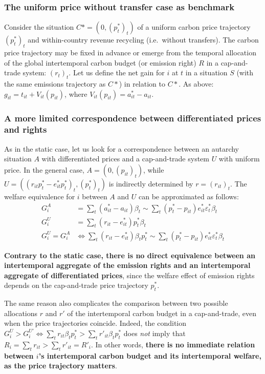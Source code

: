 \documentclass[12pt,english]{article}
\begin{document}
\subsubsection*{The uniform price without transfer case as
benchmark}\label{the-uniform-price-without-transfer-case-as-benchmark}

Consider the situation $C*=(0,(p^*_t)_t)$ of a uniform carbon price
trajectory $(p^*_t)_t$ and within-country revenue recycling
(i.e.~without transfers). The carbon price trajectory may be fixed in
advance or emerge from the temporal allocation of the global
intertemporal carbon budget (or emission right) $R$ in a cap-and-trade
system: $(r_{t})_t$. Let us define the net gain for $i$ at $t$ in
a situation $S$ (with the same emissions trajectory as $C*$) in
relation to $C*$. As above: $g_{it} = t_{it} + V_{it}(p_{it})$,
where $V_{it}(p_{it}) = a^*_{it} - a_{it}$.

\subsubsection*{A more limited correspondence between differentiated
prices and
rights}\label{a-more-limited-correspondence-between-differentiated-prices-and-rights}

As in the static case, let us look for a correspondence between an
autarchy situation $A$ with differentiated prices and a cap-and-trade
system $U$ with uniform price. In the general case,
$A=(0, (p_{it})_t)$, while
$U=((r_{it}p^*_t-e^*_{it}p^*_t)_t, (p^*_t)_t)$ is indirectly
determined by $r=(r_{it})_t$. The welfare equivalence for $i$ between $A$ and $U$ can be approximated as follows: 
$$\begin{aligned}
G^A_i &= \sum_t (a^*_{it} - a_{it})\beta_t \sim \sum_t (p^*_t - p_{it}) e^*_{it}  \varepsilon^*_t \beta_t \\
G^U_i &= \sum_t (r_{it} - e^*_{it}) p^*_t \beta_t \\
G^U_i = G^A_i &\Leftrightarrow \sum_t (r_{it} - e^*_{it}) \beta_t p^*_t  \sim \sum_t (p^*_t - p_{it}) e^*_{it}  \varepsilon^*_t \beta_t
\end{aligned}$$

\textbf{Contrary to the static case, there is no direct equivalence
between an intertemporal aggregate of the emission rights and an
intertemporal aggregate of differentiated prices}, since the welfare
effect of emission rights depends on the cap-and-trade price trajectory
$p^*_t$.

The same reason also complicates the comparison between two possible
allocations $r$ and $r'$ of the intertemporal carbon budget in a
cap-and-trade, even when the price trajectories coincide. Indeed, the
condition
$G^U_i > G^{U'}_i \Leftrightarrow \sum_t r_{it} \beta_t p^*_t > \sum_t r'_{it} \beta_t p^*_t$
does \emph{not} imply that
$R_i = \sum_t r_{it} > \sum_t r'_{it} = R'_i$. In other words,
\textbf{there is no immediate relation between $i$'s intertemporal
carbon budget and its intertemporal welfare, as the price trajectory
matters}.
\end{document}
